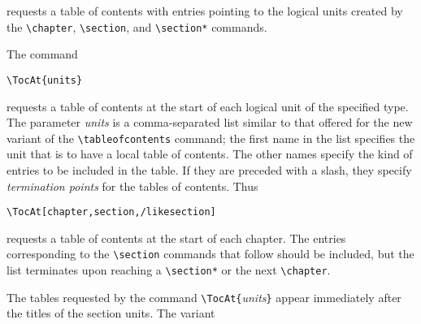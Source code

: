 requests a table of contents with entries pointing to the logical units
created by the \verb|\chapter|, \verb|\section|, and \verb|\section*|
commands. 


The command 

\begin{lstlisting}
\TocAt{units} 
\end{lstlisting}

requests a table of contents at the start of each logical unit of the specified type. 
The parameter \emph{units} is a comma-separated list similar to that offered for the new 
variant of the \verb|\tableofcontents| command; the first name in the list specifies the 
unit that is to have a local table of contents. The other names specify the kind of 
entries to be included in the table. If they are preceded with a slash, they specify 
\emph{termination points} for the tables of contents. Thus 

\begin{lstlisting}
\TocAt[chapter,section,/likesection] 
\end{lstlisting}

requests a table of contents at the start of each chapter. The entries
corresponding to the \verb|\section| commands that follow should be
included, but the list terminates upon reaching a \verb|\section*| or
the next \verb|\chapter|. 

The tables requested by the command \verb|\TocAt{|\emph{units}\verb|}| appear immediately after 
the titles of the section units. The variant 

